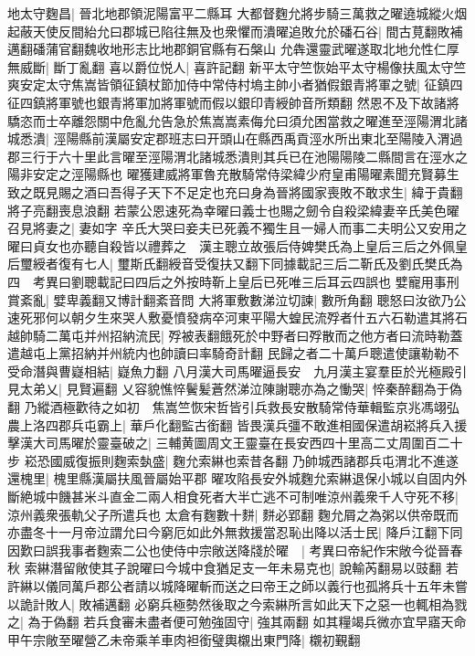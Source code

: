 地太守麴昌|{
	晉北地郡領泥陽富平二縣耳}
大都督麴允將步騎三萬救之曜遶城縱火烟起蔽天使反間紿允曰郡城已陷往無及也衆懼而潰曜追敗允於磻石谷|{
	間古莧翻敗補邁翻磻蒲官翻魏收地形志比地郡銅官縣有石槃山}
允犇還靈武曜遂取北地允性仁厚無威斷|{
	斷丁亂翻}
喜以爵位悦人|{
	喜許記翻}
新平太守竺恢始平太守楊像扶風太守竺爽安定太守焦嵩皆領征鎮杖節加侍中常侍村塢主帥小者猶假銀青將軍之號|{
	征鎮四征四鎮將軍號也銀青將軍加將軍號而假以銀印青綬帥音所類翻}
然恩不及下故諸將驕恣而士卒離怨關中危亂允告急於焦嵩嵩素侮允曰須允困當救之曜進至涇陽渭北諸城悉潰|{
	涇陽縣前漢屬安定郡班志曰开頭山在縣西禹貢涇水所出東北至陽陵入渭過郡三行于六十里此言曜至涇陽渭北諸城悉潰則其兵已在池陽陽陵二縣間言在涇水之陽非安定之涇陽縣也}
曜獲建威將軍魯充散騎常侍梁緯少府皇甫陽曜素聞充賢募生致之既見賜之酒曰吾得子天下不足定也充曰身為晉將國家喪敗不敢求生|{
	緯于貴翻將子亮翻喪息浪翻}
若蒙公恩速死為幸曜曰義士也賜之劒令自殺梁緯妻辛氏美色曜召見將妻之|{
	妻如字}
辛氏大哭曰妾夫已死義不獨生且一婦人而事二夫明公又安用之曜曰貞女也亦聽自殺皆以禮葬之　漢主聰立故張后侍婢樊氏為上皇后三后之外佩皇后璽綬者復有七人|{
	璽斯氏翻綬音受復扶又翻下同據載記三后二靳氏及劉氏樊氏為四　考異曰劉聰載記曰四后之外按時靳上皇后已死唯三后耳云四誤也}
嬖寵用事刑賞紊亂|{
	嬖卑義翻又博計翻紊音問}
大將軍敷數涕泣切諫|{
	數所角翻}
聰怒曰汝欲乃公速死邪何以朝夕生來哭人敷憂憤發病卒河東平陽大蝗民流殍者什五六石勒遣其將石越帥騎二萬屯并州招納流民|{
	殍被表翻餓死於中野者曰殍散而之他方者曰流時勒蓋遣越屯上黨招納并州統内也帥讀曰率騎奇計翻}
民歸之者二十萬戶聰遣使讓勒勒不受命潛與曹嶷相結|{
	嶷魚力翻}
八月漢大司馬曜逼長安　九月漢主宴羣臣於光極殿引見太弟乂|{
	見賢遍翻}
乂容貌憔悴鬢髪蒼然涕泣陳謝聰亦為之慟哭|{
	悴秦醉翻為于偽翻}
乃縱酒極歡待之如初　焦嵩竺恢宋哲皆引兵救長安散騎常侍華輯監京兆馮翊弘農上洛四郡兵屯霸上|{
	華戶化翻監古銜翻}
皆畏漢兵彊不敢進相國保遣胡崧將兵入援擊漢大司馬曜於靈臺破之|{
	三輔黄圖周文王靈臺在長安西四十里高二丈周圍百二十步}
崧恐國威復振則麴索埶盛|{
	麴允索綝也索昔各翻}
乃帥城西諸郡兵屯渭北不進遂還槐里|{
	槐里縣漢屬扶風晉屬始平郡}
曜攻陷長安外城麴允索綝退保小城以自固内外斷絶城中饑甚米斗直金二兩人相食死者大半亡逃不可制唯涼州義衆千人守死不移|{
	涼州義衆張軌父子所遣兵也}
太倉有麴數十䴵|{
	䴵必郢翻}
麴允屑之為粥以供帝既而亦盡冬十一月帝泣謂允曰今窮厄如此外無救援當忍恥出降以活士民|{
	降戶江翻下同}
因歎曰誤我事者麴索二公也使侍中宗敞送降牋於曜　|{
	考異曰帝紀作宋敞今從晉春秋}
索綝潛留敞使其子說曜曰今城中食猶足支一年未易克也|{
	說輸芮翻易以豉翻}
若許綝以儀同萬戶郡公者請以城降曜斬而送之曰帝王之師以義行也孤將兵十五年未嘗以詭計敗人|{
	敗補邁翻}
必窮兵極勢然後取之今索綝所言如此天下之惡一也輒相為戮之|{
	為于偽翻}
若兵食審未盡者便可勉強固守|{
	強其兩翻}
如其糧竭兵微亦宜早寤天命甲午宗敞至曜營乙未帝乘羊車肉袒銜璧輿櫬出東門降|{
	櫬初覲翻}
